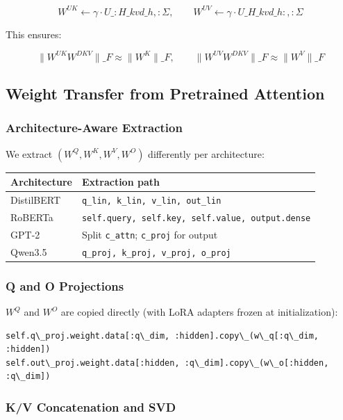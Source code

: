 \[
W^{UK} \leftarrow \gamma \cdot U\_{:H\_{kv} d\_h, :} \Sigma, \qquad
W^{UV} \leftarrow \gamma \cdot U\_{H\_{kv} d\_h:, :} \Sigma
\tag{4.6}
\]

This ensures:

\[
\|W^{UK} W^{DKV}\|\_F \approx \|W^K\|\_F, \qquad
\|W^{UV} W^{DKV}\|\_F \approx \|W^V\|\_F
\tag{4.7}
\]

\subsection{Weight Transfer from Pretrained Attention}

\subsubsection{Architecture-Aware Extraction}

We extract $(W^Q, W^K, W^V, W^O)$ differently per architecture:

\begin{table}[H]
\centering
\small
\begin{tabular}{ll}
\toprule
\textbf{Architecture} & \textbf{Extraction path} \\
\midrule
DistilBERT & \texttt{q\_lin, k\_lin, v\_lin, out\_lin} \\
RoBERTa & \texttt{self.query, self.key, self.value, output.dense} \\
GPT-2 & Split \texttt{c\_attn}; \texttt{c\_proj} for output \\
Qwen3.5 & \texttt{q\_proj, k\_proj, v\_proj, o\_proj} \\
\bottomrule
\end{tabular}
\end{table}

\subsubsection{Q and O Projections}

$W^Q$ and $W^O$ are copied directly (with LoRA adapters frozen at 
initialization):

\begin{lstlisting}
self.q\_proj.weight.data[:q\_dim, :hidden].copy\_(w\_q[:q\_dim, :hidden])
self.out\_proj.weight.data[:hidden, :q\_dim].copy\_(w\_o[:hidden, :q\_dim])
\end{lstlisting}

\subsubsection{K/V Concatenation and SVD}

